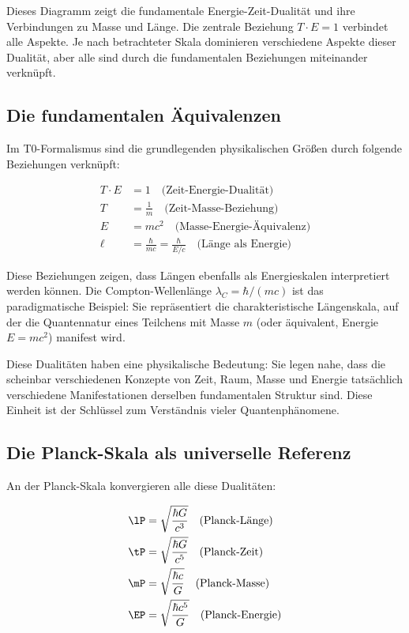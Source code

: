 	Dieses Diagramm zeigt die fundamentale Energie-Zeit-Dualität und ihre Verbindungen zu Masse und Länge. Die zentrale Beziehung $T \cdot E = 1$ verbindet alle Aspekte. Je nach betrachteter Skala dominieren verschiedene Aspekte dieser Dualität, aber alle sind durch die fundamentalen Beziehungen miteinander verknüpft.
	
	\subsection{Die fundamentalen Äquivalenzen}
	
	Im T0-Formalismus sind die grundlegenden physikalischen Größen durch folgende Beziehungen verknüpft:
	
	\begin{align}
		T \cdot E &= 1 \quad \text{(Zeit-Energie-Dualität)} \\
		T &= \frac{1}{m} \quad \text{(Zeit-Masse-Beziehung)} \\
		E &= mc^2 \quad \text{(Masse-Energie-Äquivalenz)} \\
		\ell &= \frac{\hbar}{mc} = \frac{\hbar}{E/c} \quad \text{(Länge als Energie)}
	\end{align}
	
	Diese Beziehungen zeigen, dass Längen ebenfalls als Energieskalen interpretiert werden können. Die Compton-Wellenlänge $\lambda_C = \hbar/(mc)$ ist das paradigmatische Beispiel: Sie repräsentiert die charakteristische Längenskala, auf der die Quantennatur eines Teilchens mit Masse $m$ (oder äquivalent, Energie $E = mc^2$) manifest wird.
	
	Diese Dualitäten haben eine physikalische Bedeutung: Sie legen nahe, dass die scheinbar verschiedenen Konzepte von Zeit, Raum, Masse und Energie tatsächlich verschiedene Manifestationen derselben fundamentalen Struktur sind. Diese Einheit ist der Schlüssel zum Verständnis vieler Quantenphänomene.
	
	\subsection{Die Planck-Skala als universelle Referenz}
	
	An der Planck-Skala konvergieren alle diese Dualitäten:
	
	\begin{align}
		\lP &= \sqrt{\frac{\hbar G}{c^3}} \quad \text{(Planck-Länge)} \\
		\tP &= \sqrt{\frac{\hbar G}{c^5}} \quad \text{(Planck-Zeit)} \\
		\mP &= \sqrt{\frac{\hbar c}{G}} \quad \text{(Planck-Masse)} \\
		\EP &= \sqrt{\frac{\hbar c^5}{G}} \quad \text{(Planck-Energie)}
	\end{align}
	

